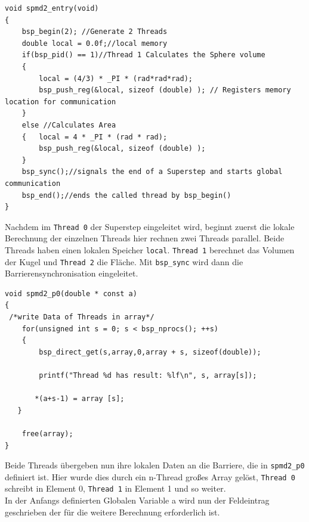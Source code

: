 \documentclass[a4paper,10pt]{scrartcl}
\begin{document}
\begin{lstlisting}
void spmd2_entry(void)
{    
    bsp_begin(2); //Generate 2 Threads
    double local = 0.0f;//local memory
    if(bsp_pid() == 1)//Thread 1 Calculates the Sphere volume
    {       
        local = (4/3) * _PI * (rad*rad*rad);
        bsp_push_reg(&local, sizeof (double) ); // Registers memory location for communication
    }    
    else //Calculates Area
    {   local = 4 * _PI * (rad * rad);
        bsp_push_reg(&local, sizeof (double) );
    }    
    bsp_sync();//signals the end of a Superstep and starts global communication
    bsp_end();//ends the called thread by bsp_begin()
} 

\end{lstlisting}
Nachdem im \texttt{Thread 0} der Superstep eingeleitet wird, beginnt zuerst die lokale Berechnung der einzelnen Threads hier rechnen zwei Threads parallel. Beide Threads haben einen lokalen Speicher \texttt{local}. \texttt{Thread 1} berechnet das Volumen der Kugel und \texttt{Thread 2} die Fläche. Mit \texttt{bsp\_sync} wird dann die Barrierensynchronisation eingeleitet. 

\newpage

\begin{lstlisting}
void spmd2_p0(double * const a)
{
 /*write Data of Threads in array*/
    for(unsigned int s = 0; s < bsp_nprocs(); ++s)
    {
        bsp_direct_get(s,array,0,array + s, sizeof(double));
        
        printf("Thread %d has result: %lf\n", s, array[s]);
        
       *(a+s-1) = array [s]; 
   }
    
    free(array);
}
\end{lstlisting}
Beide Threads übergeben nun ihre lokalen Daten an die Barriere, die in \texttt{spmd2\_p0} definiert ist. Hier wurde dies durch ein n-Thread großes Array gelöst, \texttt{Thread 0} schreibt in Element 0, \texttt{Thread 1} in Element 1 und so weiter.\\
In der Anfangs definierten Globalen Variable a wird nun der Feldeintrag geschrieben der für die weitere Berechnung erforderlich ist.
\end{document}
